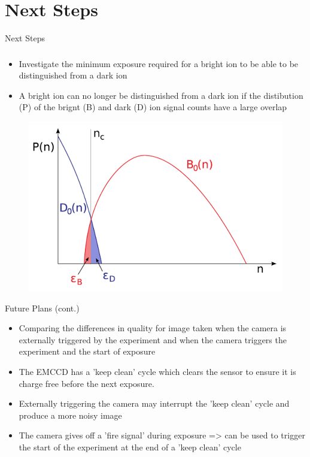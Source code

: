\documentclass{beamer}
\begin{document}
\section{Next Steps}
\begin{frame}{Next Steps}
\frametitle{}
\begin{itemize}
\item Investigate the minimum exposure required for a bright ion to be able to be distinguished from a dark ion
\bigskip
\item A bright ion can no longer be distinguished from a dark ion if the distibution (P) of the brignt (B) and dark (D) ion signal counts have a large overlap

\end{itemize}

\begin{figure}
\centering
\includegraphics[scale=0.3]{Figures/B_D_graph.png}
\end{figure}

\end{frame}

\begin{frame}{Future Plans (cont.)}

\begin{itemize}
\item Comparing the differences in quality for image taken when the camera is externally triggered by the experiment and when the camera triggers the experiment and the start of exposure
\bigskip
\item The EMCCD has a 'keep clean' cycle which clears the sensor to ensure it is charge free before the next exposure.
\bigskip
\item Externally triggering the camera may interrupt the 'keep clean' cycle and produce a more noisy image
\bigskip
\item The camera gives off a 'fire signal' during exposure => can be used to trigger the start of the experiment at the end of a 'keep clean' cycle
\end{itemize}


\end{frame}
\end{document}
